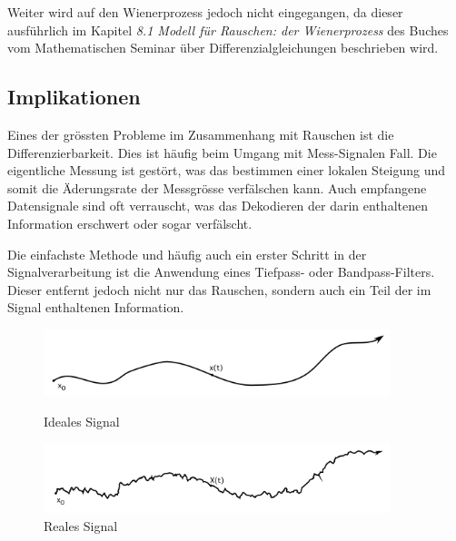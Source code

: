Weiter wird auf den Wienerprozess jedoch nicht eingegangen, da dieser ausführlich im Kapitel \glqq \textit{8.1 Modell für Rauschen: der Wienerprozess}\glqq{} des Buches vom Mathematischen Seminar über Differenzialgleichungen beschrieben wird.


\subsection{Implikationen\label{brown:Rauschen:Implikationen}}

Eines der grössten Probleme im Zusammenhang mit Rauschen ist die Differenzierbarkeit. Dies ist häufig beim Umgang mit Mess-Signalen Fall. Die eigentliche Messung ist gestört, was das bestimmen einer lokalen Steigung und somit die Äderungsrate der Messgrösse verfälschen kann. Auch empfangene Datensignale sind oft verrauscht, was das Dekodieren der darin enthaltenen Information erschwert oder sogar verfälscht.

Die einfachste Methode und häufig auch ein erster Schritt in der Signalverarbeitung ist die Anwendung eines Tiefpass- oder Bandpass-Filters. Dieser entfernt jedoch nicht nur das Rauschen, sondern auch ein Teil der im Signal enthaltenen Information.

\begin{figure}
	\centering
	\begin{minipage}{0.45\textwidth}
		\centering
		\includegraphics[width=0.9\textwidth]{papers/brown/images/idealSignal.png}
		\caption{Ideales Signal}
		\label{idealSignal}
	\end{minipage}
	\hspace{0.05\linewidth}
	\begin{minipage}{0.45\textwidth}
		\centering
		\includegraphics[width=0.9\textwidth]{papers/brown/images/realSignal.png}
		\caption{Reales Signal}
		\label{realSignal}
	\end{minipage}
\end{figure}

